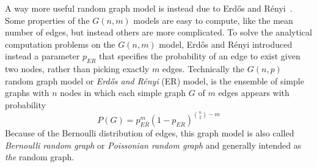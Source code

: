 A way more useful random graph model is instead due to Erd\H{o}s and Rényi~\cite{Erdos1959}. Some properties of the $G(n,m)$ models are easy to compute, like the mean number of edges, but instead others are more complicated. To solve the analytical computation problems on the $G(n,m)$ model, Erd\H{o}s and Rényi introduced instead a parameter $p_{ER}$ that specifies the probability of an edge to exist given two nodes, rather than picking exactly $m$ edges. Technically the $G(n,p)$ random graph model or \emph{Erd\H{o}s and Rényi} (ER) model, is the ensemble of simple graphs with $n$ nodes in which each simple graph $G$ of $m$ edges appears with probability
\begin{equation}
P(G)={p}_{ER}^{m}(1-p_{ER})^{\binom{n}{2}-m}
\end{equation}
Because of the Bernoulli distribution of edges, this graph model is also called \emph{Bernoulli random graph} or \emph{Poissonian random graph} and generally intended as \emph{the} random graph.

